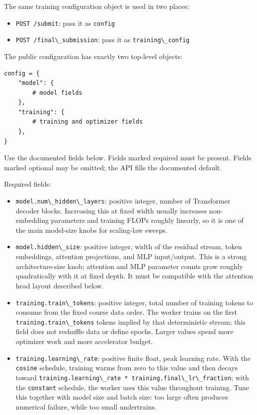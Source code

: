 \documentclass[
]{article}
\newcommand{\passthrough}[1]{#1}
\providecommand{\tightlist}{%
  \setlength{\itemsep}{0pt}\setlength{\parskip}{0pt}}
\begin{document}
The same training configuration object is used in two places:

\begin{itemize}
\tightlist
\item
  \passthrough{\lstinline!POST /submit!}: pass it as
  \passthrough{\lstinline!config!}
\item
  \passthrough{\lstinline!POST /final\_submission!}: pass it as
  \passthrough{\lstinline!training\_config!}
\end{itemize}

The public configuration has exactly two top-level objects:

\begin{verbatim}
config = {
    "model": {
        # model fields
    },
    "training": {
        # training and optimizer fields
    },
}
\end{verbatim}

Use the documented fields below. Fields marked required must be present.
Fields marked optional may be omitted; the API fills the documented
default.

Required fields:

\begin{itemize}
\tightlist
\item
  \passthrough{\lstinline!model.num\_hidden\_layers!}: positive integer,
  number of Transformer decoder blocks. Increasing this at fixed width
  usually increases non-embedding parameters and training FLOPs roughly
  linearly, so it is one of the main model-size knobs for scaling-law
  sweeps.
\item
  \passthrough{\lstinline!model.hidden\_size!}: positive integer, width
  of the residual stream, token embeddings, attention projections, and
  MLP input/output. This is a strong architecture-size knob; attention
  and MLP parameter counts grow roughly quadratically with it at fixed
  depth. It must be compatible with the attention head layout described
  below.
\item
  \passthrough{\lstinline!training.train\_tokens!}: positive integer,
  total number of training tokens to consume from the fixed course data
  order. The worker trains on the first
  \passthrough{\lstinline!training.train\_tokens!} tokens implied by
  that deterministic stream; this field does not reshuffle data or
  define epochs. Larger values spend more optimizer work and more
  accelerator budget.
\item
  \passthrough{\lstinline!training.learning\_rate!}: positive finite
  float, peak learning rate. With the \passthrough{\lstinline!cosine!}
  schedule, training warms from zero to this value and then decays
  toward
  \passthrough{\lstinline!training.learning\_rate * training.final\_lr\_fraction!};
  with the \passthrough{\lstinline!constant!} schedule, the worker uses
  this value throughout training. Tune this together with model size and
  batch size: too large often produces numerical failure, while too
  small undertrains.
\end{itemize}
\end{document}
